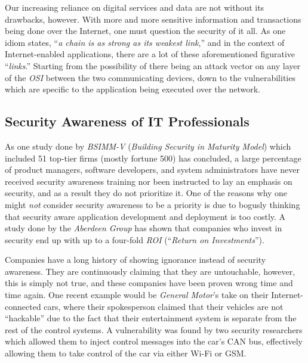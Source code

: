 \documentclass[a4paper,12pt]{article}
\begin{document}
	Our increasing reliance on digital services and data are not without its drawbacks, however. With more and more sensitive information and transactions being done over the Internet, one must question the security of it all. As one idiom states, ``\textit{a chain is as strong as its weakest link},'' and in the context of Internet-enabled applications, there are a lot of these aforementioned figurative ``\textit{links}.'' Starting from the possibility of there being an attack vector on any layer of the \textit{OSI} between the two communicating devices, down to the vulnerabilities which are specific to the application being executed over the network.
	
\subsection{Security Awareness of IT Professionals}
 
	
	As one study done by \textit{BSIMM-V} (\textit{Building Security in Maturity Model}) which included 51 top-tier firms (mostly fortune 500) has concluded\cite{gmcgraw12}, a large percentage of product managers, software developers, and system administrators have never received security awareness training nor been instructed to lay an emphasis on security, and as a result they do not prioritize it. One of the reasons why one might \textit{not} consider security awareness to be a priority is due to bogusly thinking that security aware application development and deployment is too costly. A study done by the \textit{Aberdeen Group} has shown that companies who invest in security end up with up to a four-fold \textit{ROI} (``\textit{Return on Investments}'').\cite{aberdeen11}
	
	Companies have a long history of showing ignorance instead of security awareness. They are continuously claiming that they are untouchable, however, this is simply not true, and these companies have been proven wrong time and time again. One recent example would be \textit{General Motor}'s take on their Internet-connected cars, where their spokesperson claimed that their vehicles are not ``hackable'' due to the fact that their entertainment system is separate from the rest of the control systems. A vulnerability was found by two security researchers\cite{cmiller15} which allowed them to inject control messages into the car's CAN bus, effectively allowing them to take control of the car via either Wi-Fi or GSM.
	
\end{document}
